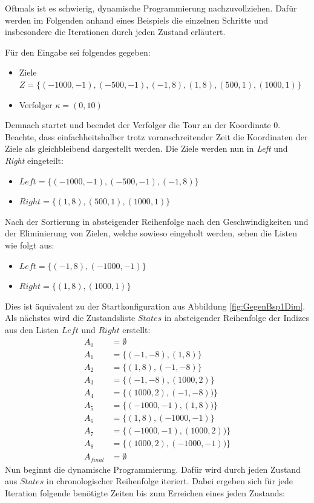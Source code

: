 \documentclass[german,version-2019-11]{uzl-thesis}
\begin{document}
Oftmals ist es schwierig, dynamische Programmierung nachzuvollziehen. Dafür werden im Folgenden anhand eines Beispiels die einzelnen Schritte und insbesondere die Iterationen durch jeden Zustand erläutert.
\begin{example}
\label{example:1D}
Für den Eingabe sei folgendes gegeben:
\begin{itemize}
\item Ziele $Z=\{(-1000,-1),(-500,-1),(-1,8),(1,8),(500,1),(1000,1)\}$
\item Verfolger $\kappa=(0,10)$
\end{itemize}
Demnach startet und beendet der Verfolger die Tour an der Koordinate $0$. Beachte, dass einfachheitshalber trotz voranschreitender Zeit die Koordinaten der Ziele als gleichbleibend dargestellt werden. Die Ziele werden nun in \emph{Left} und \emph{Right} eingeteilt:
\begin{itemize}
\item $Left=\{(-1000,-1),(-500,-1),(-1,8)\}$ 
\item $Right=\{(1,8),(500,1),(1000,1)\}$
\end{itemize}
Nach der Sortierung in absteigender Reihenfolge nach den Geschwindigkeiten und der Eliminierung von Zielen, welche sowieso eingeholt werden, sehen die Listen wie folgt aus:
\begin{itemize}
\item $Left=\{(-1,8),(-1000,-1)\}$ 
\item $Right=\{(1,8),(1000,1)\}$
\end{itemize}
Dies ist äquivalent zu der Startkonfiguration aus Abbildung \ref{fig:GegenBsp1Dim}. Als nächstes wird die Zustandsliste $States$ in absteigender Reihenfolge der Indizes aus den Listen $Left$ und $Right$ erstellt:
\begin{align*}
A_0&=\emptyset\\
A_1&=\{(-1, -8), (1, 8)\}\\
A_2&=\{(1, 8), (-1, -8)\}\\ 
A_3&=\{(-1, -8), (1000, 2)\}\\
A_4&=\{(1000, 2), (-1, -8))\}\\
A_5&=\{(-1000, -1), (1, 8))\}\\
A_6&=\{(1, 8), (-1000, -1)\}\\
A_7&=\{(-1000, -1), (1000, 2))\}\\
A_8&=\{(1000, 2), (-1000, -1))\}\\
A_{final}&=\emptyset
\end{align*}
Nun beginnt die dynamische Programmierung. Dafür wird durch jeden Zustand aus $States$ in chronologischer Reihenfolge iteriert. Dabei ergeben sich für jede Iteration folgende benötigte Zeiten bis zum Erreichen eines jeden Zustands:

\end{example}
\end{document}
